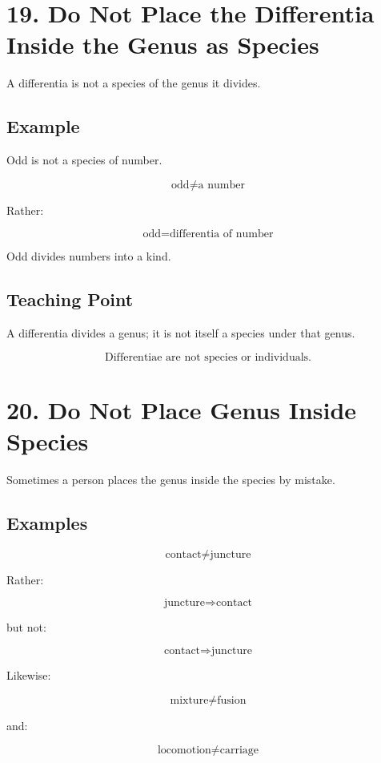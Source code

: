 \documentclass[12pt]{article}
\begin{document}
\section*{19. Do Not Place the Differentia Inside the Genus as Species}

A differentia is not a species of the genus it divides.

\subsection*{Example}

Odd is not a species of number.

\[
\text{odd} \neq \text{a number}
\]

Rather:

\[
\text{odd} = \text{differentia of number}
\]

Odd divides numbers into a kind.

\subsection*{Teaching Point}

A differentia divides a genus; it is not itself a species under that genus.

\[
\boxed{
\text{Differentiae are not species or individuals.}
}
\]

\section*{20. Do Not Place Genus Inside Species}

Sometimes a person places the genus inside the species by mistake.

\subsection*{Examples}

\[
\text{contact} \neq \text{juncture}
\]

Rather:

\[
\text{juncture} \Rightarrow \text{contact}
\]

but not:

\[
\text{contact} \Rightarrow \text{juncture}
\]

Likewise:

\[
\text{mixture} \neq \text{fusion}
\]

and:

\[
\text{locomotion} \neq \text{carriage}
\]
\end{document}

